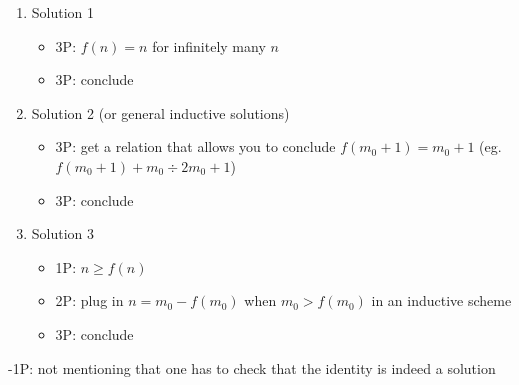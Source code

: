 \begin{enumerate}
    \item Solution 1
    \begin{itemize}
        \item 3P: $f(n)=n$ for infinitely many $n$
        \item 3P: conclude
    \end{itemize}
    \item Solution 2 (or general inductive solutions)
    \begin{itemize}
        \item 3P: get a relation that allows you to conclude $f(m_0+1)=m_0+1$ (eg. $f(m_0+1)+m_0\div 2m_0+1$)
        \item 3P: conclude
    \end{itemize}
    \item Solution 3
    \begin{itemize}
        \item 1P: $n\geq f(n)$
        \item 2P: plug in $n=m_0-f(m_0)$ when $m_0>f(m_0)$ in an inductive scheme
        \item 3P: conclude
    \end{itemize}
\end{enumerate}

-1P: not mentioning that one has to check that the identity is indeed a solution